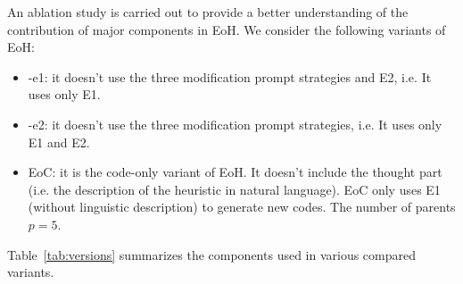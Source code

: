 An ablation study is carried out to provide a better understanding of the contribution of major components in EoH. We consider the following variants of EoH:
\begin{itemize}
    \item \ourmethod{}-e1: it doesn't use the three modification prompt strategies and E2, i.e. It uses only E1. 
    \item \ourmethod{}-e2: it doesn't use the three modification prompt strategies, i.e. It uses only E1 and E2. 
    \item EoC: it is the code-only variant of EoH. It doesn't include the thought part (i.e. the description of the heuristic in natural language). EoC only uses E1 (without linguistic description) to generate new codes. The number of parents $p=5$.
    \end{itemize}
    Table~\ref{tab:versions} summarizes the components used in various compared variants.
\begin{table}[t]
\centering
\caption{Comparison of different EoH variants on thoughts, codes, and prompt strategies in ablation study.}~\label{tab:versions}
\renewcommand{\arraystretch}{1.2}
\end{table}


